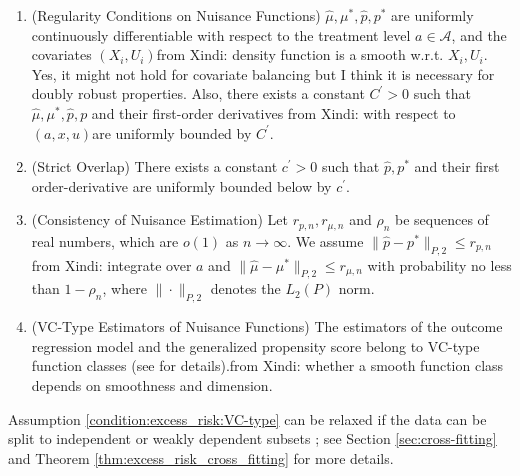 \documentclass[12pt]{article}
\newcommand{\CP}[1]{{\color{purple}From Chan: #1}}
\newcommand{\XL}[1]{{\color{blue}from Xindi: #1}}
\begin{document}
 \begin{enumerate}[label=(C\arabic*)]
     \item \label{condition:excess_risk:smooth} (Regularity Conditions on Nuisance Functions) $\widehat\mu,\mu^*,\widehat p,p^*$ are uniformly continuously differentiable with respect to the treatment level $a\in\mathcal{A}$, and the covariates $(X_i,U_i)$\XL{density function is a smooth w.r.t. $X_i,U_i$. Yes, it might not hold for covariate balancing but I think it is necessary for doubly robust properties}. Also,
     there exists a constant $C^\prime>0$ such that $\widehat\mu,\mu^*, \widehat p, p$ and their first-order derivatives \XL{with respect to $(a,x,u)$}are uniformly bounded by $C^\prime$. 
     \item \label{condition:excess_risk:overlap}(Strict Overlap) There exists a constant $c^\prime >0$ such that
     $\widehat p,p^*$ and their first order-derivative are uniformly bounded below by $c^\prime$.  
     \item \label{condition:excess_risk:nuisance}(Consistency of Nuisance Estimation) Let $r_{p,n},r_{\mu,n}$ and $\rho_n$ be sequences of real numbers, which are $o(1)$ as $n\rightarrow\infty$. We assume $\|\widehat{p} - p^*\|_{P,2} \leq r_{p,n}$ \XL{integrate over $a$} and $\|\widehat{\mu} - \mu^*\|_{P,2} \leq r_{\mu,n}$ with probability no less than $1 - \rho_n$, where $\|\cdot\|_{P,2}$ denotes the $L_2(P)$ norm.
     \item \label{condition:excess_risk:VC-type} (VC-Type Estimators of Nuisance Functions) The estimators of the outcome regression model and the generalized propensity score belong to VC-type function classes (see \citet{kosorok2008introduction} for details).\XL{whether a smooth function class depends on smoothness and dimension.}
 \end{enumerate}
Assumption \ref{condition:excess_risk:VC-type} can be relaxed if the data can be split to independent or weakly dependent subsets \citep{chernozhukov2018double,colangelo2025double}; see Section \ref{sec:cross-fitting} and Theorem \ref{thm:excess_risk_cross_fitting} for more details.
\end{document}
